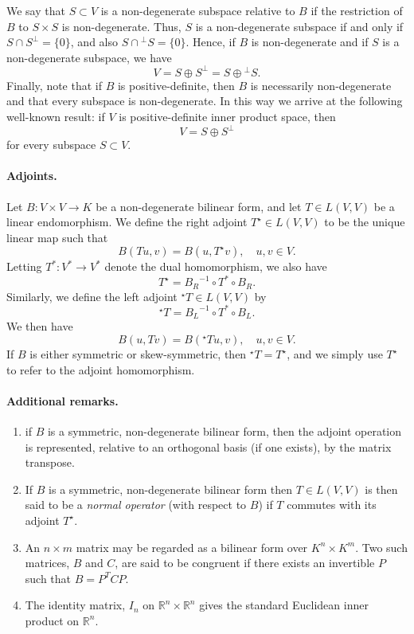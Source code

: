 \documentclass[12pt]{article}
\newcommand{\Rset}{\mathbb{R}}
\begin{document}
We say that $S\subset V$ is a non-degenerate subspace relative to $B$
if the restriction of $B$ to $S\times S$ is non-degenerate.  Thus, $S$
is a non-degenerate subspace if and only if $S \cap S^\perp = \{0\}$,
and also $S\cap {}^\perp S = \{ 0\}$.  Hence, if $B$ is non-degenerate
and if $S$ is a non-degenerate
subspace, we have
\[ V = S \oplus S^\perp = S\oplus {}^\perp S.\] Finally, note that if
$B$ is positive-definite, then $B$ is necessarily non-degenerate and
that every subspace is non-degenerate.  In this way we arrive at the
following well-known result: if $V$ is positive-definite inner product
space, then
\[V = S \oplus S^\perp \] for every subspace $S\subset V$.

\paragraph{Adjoints.}
Let $B: V \times V \rightarrow K$ be a non-degenerate bilinear
form, and let  $T \in L(V,V)$ be a linear endomorphism.  We define the
right adjoint $T^\star \in 
L(V,V)$ to be the unique linear map such that
\[ B(Tu, v) = B(u, T^\star v) ,\quad u,v \in V.\]
Letting $T^\ast : V^\ast \to V^\ast$ denote the  dual homomorphism,
we also have
\[ T^\star = {B_R}^{-1} \circ T^\ast \circ B_R.\]
Similarly, we define the left adjoint ${}^\star T\in L(V,V)$ by
\[ {}^\star T = {B_L}^{-1} \circ T^\ast \circ B_L.\] We then have
\[ B(u, Tv) = B({}^\star  T u, v) ,\quad u,v \in V.\]
If $B$ is either symmetric or skew-symmetric, then ${}^\star T =
T^\star$, and we simply use $T^\star$ to refer to the adjoint homomorphism.

\paragraph{Additional remarks.}
\begin{enumerate}
\item 
if $B$ is a symmetric, non-degenerate bilinear form,
then the adjoint operation is represented, relative to an orthogonal
basis (if one exists), by the matrix transpose.

\item  If $B$ is a symmetric, non-degenerate bilinear form
then $T\in L(V,V)$ is then said to be a \emph{normal operator} (with
respect to $B$) if $T$ commutes with its adjoint $T^\star$.


\item An $n \times m$ matrix may be regarded as a bilinear form over
  $K^n\times K^m$. Two such matrices, $B$ and $C$, are said to be
  congruent if there exists an invertible $P$ such that $B = P^{T}CP$.

\item The identity matrix, $I_n$ on $\Rset^n\times \Rset^n$ gives the standard
Euclidean inner product on $\Rset^n$.
\end{enumerate}



\end{document}
